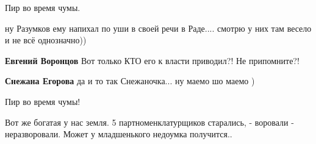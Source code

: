 \begin{itemize}
Пир во время чумы.

 
ну Разумков ему напихал по уши в своей речи в Раде.... смотрю у них там весело и не всё однозначно))

\begin{itemize}
 
\textbf{Евгений Воронцов} Вот только КТО его к власти приводил?!
Не припомните?!

 
\textbf{Снежана Егорова} да и то так Снежаночка... ну маемо шо маемо )
\end{itemize}

 
Пир во время чумы!

 

Вот же богатая у нас земля. 5 партноменклатурщиков старались, - воровали -
неразворовали. Может у младшенького недоумка получится..

\begin{itemize}
 

\end{itemize}
\end{itemize}
